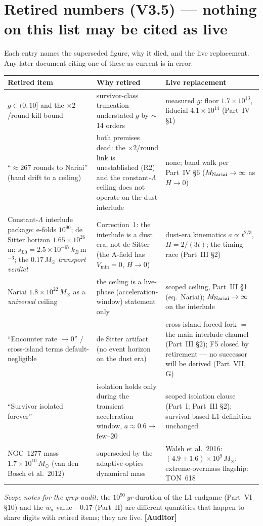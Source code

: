 \documentclass[11pt]{article}
\newcommand{\Auditor}{\textbf{\textcolor{teal!55!black}{[Auditor]}}}
\begin{document}
\section{Retired numbers (V3.5) --- nothing on this list may be cited as live}
Each entry names the superseded figure, why it died, and the live replacement. Any later document citing one of these as current is in error.
\begin{center}\small
\begin{tabular}{@{}p{}p{}p{}@{}}\toprule
\textbf{Retired item} & \textbf{Why retired} & \textbf{Live replacement}\\\midrule
$g\in(0,10]$ and the $\times2$/round kill bound & survivor-class truncation understated $g$ by $\sim$14 orders & measured $g$: floor $1.7\times10^{13}$, fiducial $4.1\times10^{14}$ (Part~IV \S1)\\
``$\approx267$ rounds to Nariai'' (band drift to a ceiling) & both premises dead: the $\times2$/round link is unestablished (R2) and the constant-$\Lambda$ ceiling does not operate on the dust interlude & none; band walk per Part~IV \S6 ($M_{\rm Nariai}\to\infty$ as $H\to0$)\\
Constant-$\Lambda$ interlude package: e-folds $10^{90}$; de Sitter horizon $1.65\times10^{26}$\,m; $s_{L0}=2.5\times10^{-67}\,k_B\,$m$^{-3}$; the $0.17\,M_\odot$ \emph{transport verdict} & Correction~1: the interlude is a dust era, not de Sitter (the A-field has $V_{\min}=0$, $H\to0$) & dust-era kinematics $a\propto t^{2/3}$, $H=2/(3t)$; the timing race (Part~III \S2)\\
Nariai $1.8\times10^{22}\,M_\odot$ as a \emph{universal} ceiling & the ceiling is a live-phase (acceleration-window) statement only & scoped ceiling, Part~III \S1 (eq.\ Nariai); $M_{\rm Nariai}\to\infty$ on the interlude\\
``Encounter rate $\to0$'' / cross-island terms default-negligible & de Sitter artifact (no event horizon on the dust era) & cross-island forced fork $=$ the main interlude channel (Part~III \S2); F5 closed by retirement --- no successor will be derived (Part~VII, G)\\
``Survivor isolated forever'' & isolation holds only during the transient acceleration window, $a\approx0.6\to$ few--20 & scoped isolation clause (Part~I; Part~III \S2); survival-based L1 definition unchanged\\
NGC~1277 mass $1.7\times10^{10}\,M_\odot$ (van den Bosch et al.\ 2012) & superseded by the adaptive-optics dynamical mass & Walsh et al.\ 2016: $(4.9\pm1.6)\times10^{9}\,M_\odot$; extreme-overmass flagship: TON~618\\\bottomrule
\end{tabular}\end{center}
\emph{Scope notes for the grep-audit:} the $10^{90}$\,\emph{yr} duration of the L1 endgame (Part~VI \S10) and the $w_a$ value $-0.17$ (Part~II) are different quantities that happen to share digits with retired items; they are live. \Auditor
\end{document}
